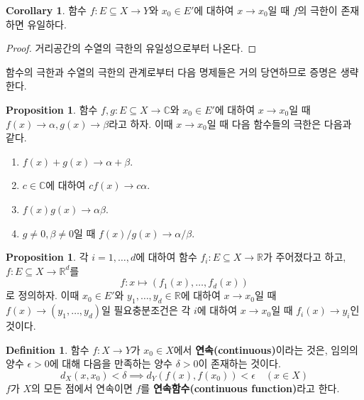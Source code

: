 \documentclass[11pt]{book}
\numberwithin{equation}{chapter}
\def\RR{\mathbb{R}}
\def\CC{\mathbb{C}}
\def\eps{\epsilon}
\theoremstyle{definition}
\newtheorem{cor}[thm]{Corollary}
\newtheorem{prop}[thm]{Proposition}
\newtheorem{defn}[thm]{Definition}
\newenvironment{enum}
	{\begin{enumerate}[label=(\alph*), leftmargin=2\parindent]}
	{\end{enumerate}}
\begin{document}
\begin{cor}
    함수 \(f : E \subseteq X \to Y\)와 \(x_0 \in E'\)에 대하여 \(x \to x_0\)일 때 \(f\)의 극한이 존재하면 유일하다.
\end{cor}
\begin{proof}
    거리공간의 수열의 극한의 유일성으로부터 나온다.
\end{proof}

함수의 극한과 수열의 극한의 관계로부터 다음 명제들은 거의 당연하므로 증명은 생략한다.

\begin{prop}
    함수 \(f, g : E \subseteq X \to \CC\)와 \(x_0 \in E'\)에 대하여 \(x \to x_0\)일 때 \(f(x) \to \alpha, g(x) \to \beta\)라고 하자. 이때 \(x \to x_0\)일 때 다음 함수들의 극한은 다음과 같다.
    \begin{enum}
        \item \(f(x)+g(x) \to \alpha + \beta\).
        \item \(c \in \CC\)에 대하여 \(cf(x) \to c\alpha\).
        \item \(f(x)g(x) \to \alpha\beta\).
        \item \(g \ne 0, \beta \ne 0\)일 때 \(f(x)/g(x) \to \alpha/\beta\).
    \end{enum}
\end{prop}

\begin{prop}
    각 \(i = 1, \ldots, d\)에 대하여 함수 \(f_i : E \subseteq X \to \RR\)가 주어졌다고 하고, \(f : E \subseteq X \to \RR^d\)를
    \[
    f : x \mapsto (f_1(x), \ldots, f_d(x))    
    \]
    로 정의하자. 이때 \(x_0 \in E'\)와 \(y_1, \ldots, y_d \in \RR\)에 대하여 \(x \to x_0\)일 때 \(f(x) \to (y_1, \ldots, y_d)\)일 필요충분조건은 각 \(i\)에 대하여 \(x \to x_0\)일 때 \(f_i(x) \to y_i\)인 것이다.
\end{prop}

\begin{defn}
    함수 \(f : X \to Y\)가 \(x_0 \in X\)에서 \textbf{연속(continuous)}이라는 것은, 임의의 양수 \(\eps > 0\)에 대해 다음을 만족하는 양수 \(\delta > 0\)이 존재하는 것이다.
    \[
    d_X(x, x_0) < \delta \implies d_Y(f(x), f(x_0)) < \eps \quad (x \in X)    
    \]
    \(f\)가 \(X\)의 모든 점에서 연속이면 \(f\)를 \textbf{연속함수(continuous function)}라고 한다.
\end{defn}
\end{document}
